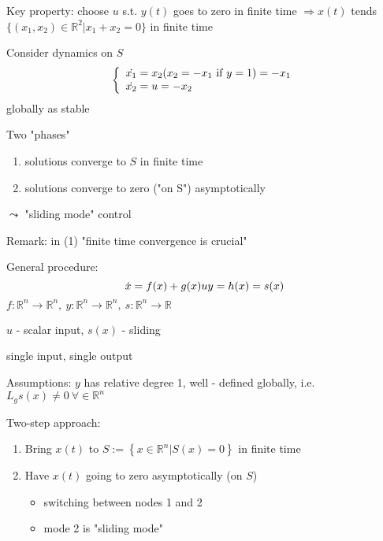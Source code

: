 
Key property: choose $u$ s.t. $y(t)$ goes to zero in finite time $\Rightarrow x(t)$ tends $\{ (x_1, x_2) \in \mathbb{R}^2 | x_1 +x_2 = 0 \}$ in finite time

Consider dynamics on $S$
\begin{equation*}
\left\{ \begin{array}{l}
                  \dot{x_1} = x_2 (x_2 = -x_1 \ $if$ \  y =1) = -x_1\\
                 \dot{x_2} = u = -x_2
                \end{array}
              \right. 
\end{equation*} 
globally as stable


Two "phases"
\begin{enumerate}
\item solutions converge to $S$ in finite time
\item solutions converge to zero ("on S") asymptotically
\end{enumerate}
$\leadsto $ "sliding mode" control

Remark: in (1) "finite time convergence is crucial"

General procedure:
\begin{equation*}
\dot{x} = f(x)+g(x)u \\
y = h(x)= s(x)
\end{equation*}
$f: \mathbb{R}^n \to \mathbb{R}^n, \  y : \mathbb{R}^n \to \mathbb{R}^n, \ s: \mathbb{R}^n \to \mathbb{R}$

$u$ - scalar input, $s(x)$ - sliding

single input, single output 

Assumptions: $y$ has relative degree 1, well - defined globally, i.e. $L_gs(x) \neq 0 \ \forall \in \mathbb{R}^n$

Two-step approach:
\begin{enumerate}
\item Bring $x(t)$ to $S := \left \{ x \in \mathbb{R}^n | S(x) = 0 \right\}$ in finite time
\item Have $x(t)$ going to zero asymptotically (on $S$)
\begin{itemize}
\item switching between nodes 1 and 2
\item mode 2 is "sliding mode"
\end{itemize}
\end{enumerate} 

